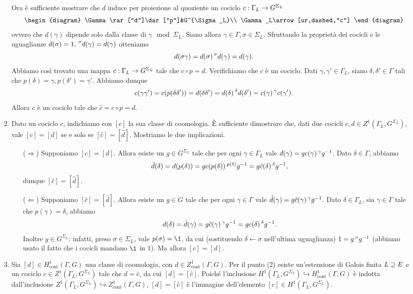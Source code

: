 \documentclass[a4paper]{article}
\newcommand*{\cont}{\ensuremath{\text{cont}}}
\begin{document}
\begin{enumerate}[(1)]
Ora è sufficiente mostrare che $d$ induce per proiezione al quoziente un cociclo $c:\Gamma_L\rightarrow G^{\Sigma_L}$
$$
\begin{diagram}
\Gamma\rar["d"]\dar["p"]&G^{\Sigma_L}\\
\Gamma_L\arrow[ur,dashed,"c"]
\end{diagram}
$$
ovvero che $d(\gamma)$ dipende solo dalla classe di $\gamma\mod\Sigma_L$. Siano allora $\gamma\in\Gamma\comma\sigma\in\Sigma_L$. Sfruttando la proprietà dei cocicli e le uguaglianze $d(\sigma)=1,\,\allowbreak\prescript{\sigma}{}{d}(\gamma)=d(\gamma)$ otteniamo
$$
d(\sigma\gamma)=d(\sigma)\prescript{\sigma}{}{d}(\gamma)=d(\gamma).
$$
Abbiamo così trovato una mappa $c:\Gamma_L\rightarrow G^{\Sigma_L}$ tale che $c\circ p=d$. Verifichiamo che $c$ è un cociclo. Dati $\gamma\comma\gamma'\in\Gamma_L$, siano $\delta\comma\delta'\in\Gamma$ tali che $p(\delta)=\gamma\comma p(\delta')=\gamma'$. Abbiamo dunque
$$
c(\gamma\gamma')=c(p(\delta\delta'))=d(\delta\delta')=d(\delta)\prescript{\delta}{}{d}(\delta')=c(\gamma)\prescript{\gamma}{}{c}(\gamma').
$$
Allora $c$ è un cociclo tale che $\hat{c}=c\circ p=d$.
\item Dato un cociclo $c$, indichiamo con $[c]$ la sua classe di coomologia. È sufficiente dimostrare che, dati due cocicli $c,d\in Z^1(\Gamma_L,G^{\Sigma_L})$, vale $[c]=[d]$ se e solo se $[\hat{c}]=[\hat{d}]$. Mostriamo le due implicazioni.
\begin{itemize}
\item[($\Rightarrow$)] Supponiamo $[c]=[d]$. Allora esiste un $g\in G^{\Sigma_L}$ tale che per ogni $\gamma\in\Gamma_L$ vale $d(\gamma)=gc(\gamma)\prescript{\gamma}{}{g}^{-1}$. Dato $\delta\in\Gamma$, abbiamo
$$
\hat{d}(\delta)=d(p(\delta))=gc(p(\delta))\prescript{p(\delta)}{}{g}^{-1}=g\hat{c}(\delta)\prescript{\delta}{}{g}^{-1},
$$
dunque $[\hat{c}]=[\hat{d}]$.
\item[($\Leftarrow$)] Supponiamo $[\hat{c}]=[\hat{d}]$. Allora esiste un $g\in G$ tale che per ogni $\gamma\in\Gamma$ vale $\hat{d}(\gamma)=g\hat{c}(\gamma)\prescript{\gamma}{}{g}^{-1}$. Dato $\delta\in\Gamma_L$, sia $\gamma\in\Gamma$ tale che $p(\gamma)=\delta$, abbiamo
$$
d(\delta)=\hat{d}(\gamma)=g\hat{c}(\gamma)\prescript{\gamma}{}{g}^{-1}=gc(\delta)\prescript{\delta}{}{g}^{-1}.
$$
Inoltre $g\in G^{\Sigma_L}$: infatti, preso $\sigma\in\Sigma_L$, vale $p(\sigma)=\1$, da cui (sostituendo $\delta\leftarrow\sigma$ nell'ultima uguaglianza) $1=g\prescript{\sigma}{}{g}^{-1}$ (abbiamo usato il fatto che i cocicli mandano $\1$ in $1$). Ma allora $[c]=[d]$.
\end{itemize}
\item Sia $[d]\in H^1_\cont(\Gamma,G)$ una classe di coomologia, con $d\in Z^1_\cont(\Gamma,G)$. Per il punto (2) esiste un'estensione di Galois finita $L\supseteq E$ e un cociclo $c\in Z^1(\Gamma_L,G^{\Sigma_L})$ tale che $d=\hat{c}$, da cui $[d]=[\hat{c}]$. Poiché l'inclusione $H^1(\Gamma_L,G^{\Sigma_L})\hookrightarrow H^1_\cont(\Gamma,G)$ è indotta dall'inclusione $Z^1(\Gamma_L,G^{\Sigma_L})\hookrightarrow Z^1_\cont(\Gamma,G)$, $[d]=[\hat{c}]$ è l'immagine dell'elemento $[c]\in H^1(\Gamma_L,G^{\Sigma_L})$.
\end{enumerate}
\end{document}
